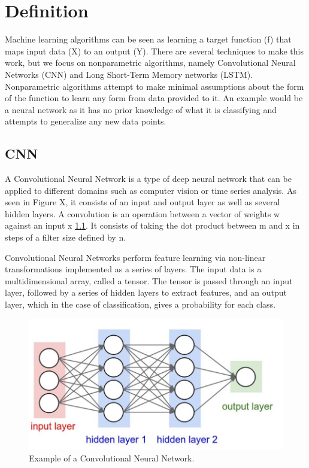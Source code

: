 \documentclass{turabian-thesis}
\newcounter{case}[section]
\begin{document}
\section{Definition}
Machine learning algorithms can be seen as learning a target function (f) that maps input data (X) to an output (Y). There are several techniques to make this work, but we focus on nonparametric algorithms, namely Convolutional Neural Networks (CNN) and Long Short-Term Memory networks (LSTM). Nonparametric algorithms attempt to make minimal assumptions about the form of the function to learn any form from data provided to it. An example would be a neural network as it has no prior knowledge of what it is classifying and attempts to generalize any new data points.

\subsection{CNN}

A Convolutional Neural Network is a type of deep neural network that can be applied to different domains such as computer vision or time series analysis. As seen in Figure X, it consists of an input and output layer as well as several hidden layers. A convolution is an operation between a vector of weights w against an input x \ref{}. It consists of taking the dot product between m and x in steps of a filter size defined by n.

Convolutional Neural Networks perform feature learning via non-linear transformations implemented as a series of layers. The input data is a multidimensional array, called a tensor. The tensor is passed through an input layer, followed by a series of hidden layers to extract features, and an output layer, which in the case of classification, gives a probability for each class. 

\begin{figure}[h!]
   \begin{center}
      \includegraphics[scale=0.3]{../media/nn_highlight.jpeg}
   \end{center}
   \caption{Example of a Convolutional Neural Network.}
   \label{fig:reinforcementAgent}
\end{figure}
\end{document}
